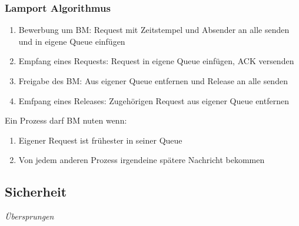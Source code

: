 \documentclass[10pt,a4paper]{article}
\begin{document}
\subsubsection{Lamport Algorithmus}
\begin{enumerate}
\item Bewerbung um BM: Request mit Zeitstempel und Absender an alle senden und in eigene Queue einfügen
\item Empfang eines Requests: Request in eigene Queue einfügen, ACK versenden
\item Freigabe des BM: Aus eigener Queue entfernen und Release an alle senden
\item Emfpang eines Releases: Zugehörigen Request aus eigener Queue entfernen
\end{enumerate}
Ein Prozess darf BM nuten wenn:
\begin{enumerate}[label=\alph*.]
\item Eigener Request ist frühester in seiner Queue 
\item Von jedem anderen Prozess irgendeine spätere Nachricht bekommen
\end{enumerate}




\subsection{Sicherheit}
\textit{Übersprungen}
\end{document}
